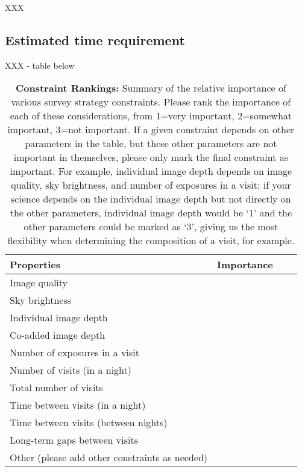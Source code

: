 \documentclass[12pt,letterpaper]{article}
\begin{document}
XXX

\subsection{Estimated time requirement}

\vspace{.3in}

XXX - table below

\begin{table}[ht]
    \centering
    \begin{tabular}{l|l|l|l}
        \toprule
        Properties & Importance \hspace{.3in} \\
        \midrule
        Image quality &     \\
        Sky brightness &  \\
        Individual image depth &   \\
        Co-added image depth &   \\
        Number of exposures in a visit   &   \\
        Number of visits (in a night)  &   \\ 
        Total number of visits &   \\
        Time between visits (in a night) &  \\
        Time between visits (between nights)  &   \\
        Long-term gaps between visits & \\
        Other (please add other constraints as needed) & \\
        \bottomrule
    \end{tabular}
    \caption{{\bf Constraint Rankings:} Summary of the relative importance of various survey strategy constraints. Please rank the importance of each of these considerations, from 1=very important, 2=somewhat important, 3=not important. If a given constraint depends on other parameters in the table, but these other parameters are not important in themselves, please only mark the final constraint as important. For example, individual image depth depends on image quality, sky brightness, and number of exposures in a visit; if your science depends on the individual image depth but not directly on the other parameters, individual image depth would be `1' and the other parameters could be marked as `3', giving us the most flexibility when determining the composition of a visit, for example.}
        \label{tab:obs_constraints}
\end{table}
\end{document}
